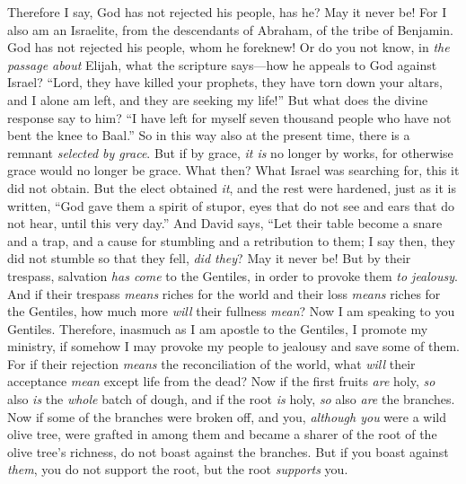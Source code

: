 \begin{biblechapter} %
 Therefore I say, God has not rejected his people, has he? May it never be! For I also am an Israelite, from the descendants of Abraham, of the tribe of Benjamin.
\verse God has not rejected his people, whom he foreknew! Or do you not know, in \textit{the passage about} Elijah, what the scripture says—how he appeals to God against Israel?
\verse “Lord, they have killed your prophets, they have torn down your altars, and I alone am left, and they are seeking my life!”
\verse But what does the divine response say to him? “I have left for myself seven thousand people who have not bent the knee to Baal.”
\verse So in this way also at the present time, there is a remnant \textit{selected by grace}.
\verse But if by grace, \textit{it is} no longer by works, for otherwise grace would no longer be grace.
\verse What then? What Israel was searching for, this it did not obtain. But the elect obtained \textit{it}, and the rest were hardened,
\verse just as it is written, “God gave them a spirit of stupor, 
eyes that do not see and ears that do not hear, 
until this very day.”
\verse And David says,
\verse “Let their table become a snare and a trap, 
and a cause for stumbling and a retribution to them;
\verse I say then, they did not stumble so that they fell, \textit{did they}? May it never be! But by their trespass, salvation \textit{has come} to the Gentiles, in order to provoke them \textit{to jealousy}.
\verse And if their trespass \textit{means} riches for the world and their loss \textit{means} riches for the Gentiles, how much more \textit{will} their fullness \textit{mean}?
 Now I am speaking to you Gentiles. Therefore, inasmuch as I am apostle to the Gentiles, I promote my ministry,
\verse if somehow I may provoke my people to jealousy and save some of them.
\verse For if their rejection \textit{means} the reconciliation of the world, what \textit{will} their acceptance \textit{mean} except life from the dead?
\verse Now if the first fruits \textit{are} holy, \textit{so} also \textit{is} the \textit{whole} batch of dough, and if the root \textit{is} holy, \textit{so} also \textit{are} the branches.
\verse Now if some of the branches were broken off, and you, \textit{although you} were a wild olive tree, were grafted in among them and became a sharer of the root of the olive tree’s richness,
\verse do not boast against the branches. But if you boast against \textit{them}, you do not support the root, but the root \textit{supports} you.

\end{biblechapter}
